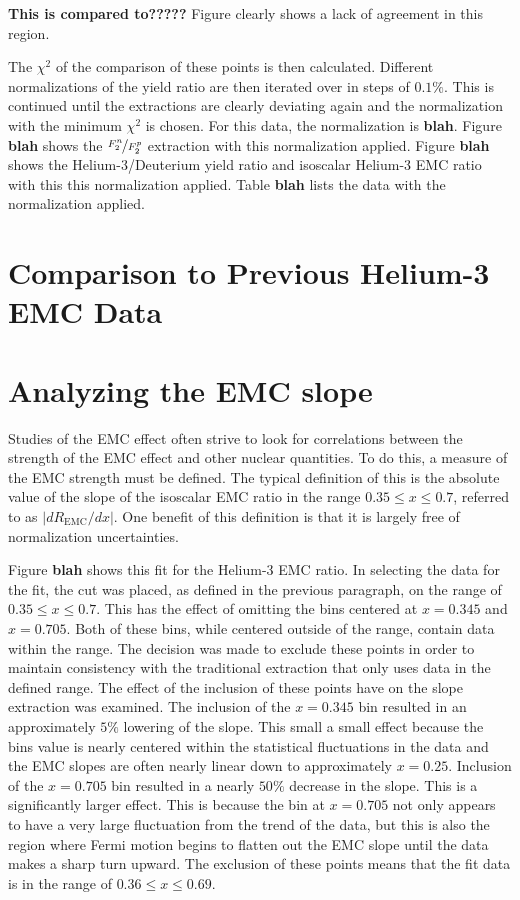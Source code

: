 \textbf{This is compared to?????} Figure clearly shows a lack of agreement in this region.

The $\chi^2$ of the comparison of these points is then calculated. Different normalizations of the yield ratio are then iterated over in steps of $0.1\%$. This is continued until the extractions are clearly deviating again and the normalization with the minimum $\chi^2$ is chosen. For this data, the normalization is \textbf{blah}. Figure \textbf{blah} shows the $\nicefrac{F_2^n}{F_2^p}$ extraction with this normalization applied. Figure \textbf{blah} shows the Helium-3/Deuterium yield ratio and isoscalar Helium-3 EMC ratio with this this normalization applied. Table \textbf{blah} lists the data with the normalization applied.

\section{Comparison to Previous Helium-3 EMC Data}



\section{Analyzing the EMC slope}

Studies of the EMC effect often strive to look for correlations between the strength of the EMC effect and other nuclear quantities. To do this, a measure of the EMC strength must be defined. The typical definition of this is the absolute value of the slope of the isoscalar EMC ratio in the range $0.35 \leq x \leq 0.7$, referred to as $\left|dR_{\text{EMC}}/dx\right|$. One benefit of this definition is that it is largely free of normalization uncertainties. 

Figure \textbf{blah} shows this fit for the Helium-3 EMC ratio. In selecting the data for the fit, the cut was placed, as defined in the previous paragraph, on the range of $0.35 \leq x \leq 0.7$. This has the effect of omitting the bins centered at $x=0.345$ and $x=0.705$. Both of these bins, while centered outside of the range, contain data within the range. The decision was made to exclude these points in order to maintain consistency with the traditional extraction that only uses data in the defined range. The effect of the inclusion of these points have on the slope extraction was examined. The inclusion of the $x=0.345$ bin resulted in an approximately $5\%$ lowering of the slope. This small a small effect because the bins value is nearly centered within the statistical fluctuations in the data and the EMC slopes are often nearly linear down to approximately $x=0.25$. Inclusion of the $x=0.705$ bin resulted in a nearly $50\%$ decrease in the slope. This is a significantly larger effect. This is because the bin at $x=0.705$ not only appears to have a very large fluctuation from the trend of the data, but this is also the region where Fermi motion begins to flatten out the EMC slope until the data makes a sharp turn upward. The exclusion of these points means that the fit data is in the range of $0.36 \leq x \leq 0.69$.

